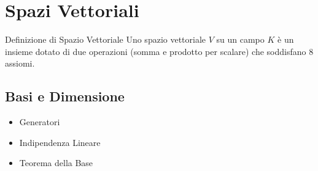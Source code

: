 \section{Spazi Vettoriali}

\begin{concept}{Definizione di Spazio Vettoriale}
Uno spazio vettoriale $V$ su un campo $K$ è un insieme dotato di due operazioni (somma e prodotto per scalare) che soddisfano 8 assiomi.
\end{concept}

\subsection{Basi e Dimensione}
\begin{itemize}
    \item Generatori
    \item Indipendenza Lineare
    \item Teorema della Base
\end{itemize}
